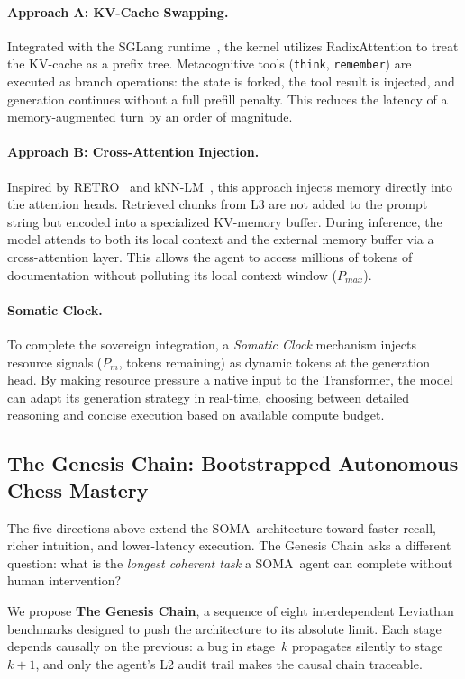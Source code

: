\documentclass[11pt,a4paper]{article}
\newcommand{\soma}{\textsc{SOMA}}
\newcommand{\Pm}{\ensuremath{P_m}}
\begin{document}
\paragraph{Approach A: KV-Cache Swapping.}
Integrated with the SGLang runtime~\cite{zheng2023sglang}, the kernel
utilizes RadixAttention to treat the KV-cache as a prefix tree.
Metacognitive tools (\texttt{think}, \texttt{remember}) are executed
as branch operations: the state is forked, the tool result is injected,
and generation continues without a full prefill penalty.
This reduces the latency of a memory-augmented turn by an order of magnitude.

\paragraph{Approach B: Cross-Attention Injection.}
Inspired by RETRO~\cite{borgeaud2022retro} and kNN-LM~\cite{khandelwal2020knnlm},
this approach injects memory directly into the attention heads.
Retrieved chunks from L3 are not added to the prompt string but
encoded into a specialized KV-memory buffer.
During inference, the model attends to both its local context and the
external memory buffer via a cross-attention layer.
This allows the agent to access millions of tokens of documentation
without polluting its local context window ($P_{max}$).

\paragraph{Somatic Clock.}
To complete the sovereign integration, a \textit{Somatic Clock}
mechanism injects resource signals (\Pm, tokens remaining) as
dynamic tokens at the generation head.
By making resource pressure a native input to the Transformer, the
model can adapt its generation strategy in real-time, choosing
between detailed reasoning and concise execution based on available
compute budget.

\subsection{The Genesis Chain: Bootstrapped Autonomous Chess Mastery}

The five directions above extend the \soma\ architecture toward
faster recall, richer intuition, and lower-latency execution.
The Genesis Chain asks a different question: what is the
\emph{longest coherent task} a \soma\ agent can complete without
human intervention?

We propose \textbf{The Genesis Chain}, a sequence of eight
interdependent Leviathan benchmarks designed to push the
architecture to its absolute limit.
Each stage depends causally on the previous: a bug in stage~$k$
propagates silently to stage~$k{+}1$, and only the agent's
L2 audit trail makes the causal chain traceable.
\end{document}
